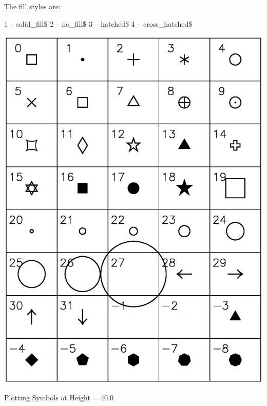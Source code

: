 The fill styles are:
\begin{example}
    1 -- solid_fill\$        
    2 -- no_fill\$           
    3 -- hatched\$           
    4 -- cross_hatched\$     
\end{example}

\begin{table}
  \centering
  \includegraphics{plot-syms.eps}
  \caption{Plotting Symbols at Height = 40.0}
  \label{t:plot.syms}
\end{table}

